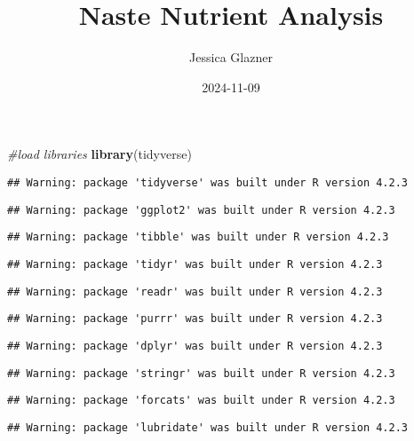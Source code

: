 \documentclass[
]{article}
\title{Naste Nutrient Analysis}
\author{Jessica Glazner}
\date{2024-11-09}
\newenvironment{Shaded}{\begin{snugshade}}{\end{snugshade}}
\newcommand{\CommentTok}[1]{\textcolor[rgb]{0.56,0.35,0.01}{\textit{#1}}}
\newcommand{\FunctionTok}[1]{\textcolor[rgb]{0.13,0.29,0.53}{\textbf{#1}}}
\newcommand{\NormalTok}[1]{#1}
\begin{document}
\maketitle

\begin{Shaded}
\begin{Highlighting}[]
\CommentTok{\#load libraries}
\FunctionTok{library}\NormalTok{(tidyverse)}
\end{Highlighting}
\end{Shaded}

\begin{verbatim}
## Warning: package 'tidyverse' was built under R version 4.2.3
\end{verbatim}

\begin{verbatim}
## Warning: package 'ggplot2' was built under R version 4.2.3
\end{verbatim}

\begin{verbatim}
## Warning: package 'tibble' was built under R version 4.2.3
\end{verbatim}

\begin{verbatim}
## Warning: package 'tidyr' was built under R version 4.2.3
\end{verbatim}

\begin{verbatim}
## Warning: package 'readr' was built under R version 4.2.3
\end{verbatim}

\begin{verbatim}
## Warning: package 'purrr' was built under R version 4.2.3
\end{verbatim}

\begin{verbatim}
## Warning: package 'dplyr' was built under R version 4.2.3
\end{verbatim}

\begin{verbatim}
## Warning: package 'stringr' was built under R version 4.2.3
\end{verbatim}

\begin{verbatim}
## Warning: package 'forcats' was built under R version 4.2.3
\end{verbatim}

\begin{verbatim}
## Warning: package 'lubridate' was built under R version 4.2.3
\end{verbatim}
\end{document}
